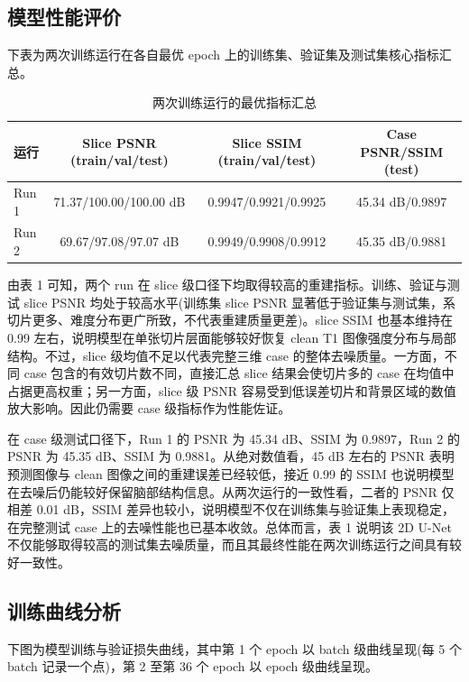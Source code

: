 \documentclass[UTF8,a4paper,12pt]{ctexart}
\begin{document}
\subsection{模型性能评价}

下表为两次训练运行在各自最优 epoch 上的训练集、验证集及测试集核心指标汇总。

\begin{table}[H]
\centering
\caption{两次训练运行的最优指标汇总}
\begin{tabular}{lccc}
\toprule
运行 & Slice PSNR (train/val/test) & Slice SSIM (train/val/test) & Case PSNR/SSIM (test) \\
\midrule
Run 1 & 71.37/100.00/100.00 dB & 0.9947/0.9921/0.9925 & 45.34 dB/0.9897 \\
Run 2 & 69.67/97.08/97.07 dB & 0.9949/0.9908/0.9912 & 45.35 dB/0.9881 \\
\bottomrule
\end{tabular}
\end{table}

由表 1 可知，两个 run 在 slice 级口径下均取得较高的重建指标。训练、验证与测试 slice PSNR 均处于较高水平(训练集 slice PSNR 显著低于验证集与测试集，系切片更多、难度分布更广所致，不代表重建质量更差)。slice SSIM 也基本维持在 0.99 左右，说明模型在单张切片层面能够较好恢复 clean T1 图像强度分布与局部结构。不过，slice 级均值不足以代表完整三维 case 的整体去噪质量。一方面，不同 case 包含的有效切片数不同，直接汇总 slice 结果会使切片多的 case 在均值中占据更高权重；另一方面，slice 级 PSNR 容易受到低误差切片和背景区域的数值放大影响。因此仍需要 case 级指标作为性能佐证。

在 case 级测试口径下，Run 1 的 PSNR 为 45.34 dB、SSIM 为 0.9897，Run 2 的 PSNR 为 45.35 dB、SSIM 为 0.9881。从绝对数值看，45 dB 左右的 PSNR 表明预测图像与 clean 图像之间的重建误差已经较低，接近 0.99 的 SSIM 也说明模型在去噪后仍能较好保留脑部结构信息。从两次运行的一致性看，二者的 PSNR 仅相差 0.01 dB，SSIM 差异也较小，说明模型不仅在训练集与验证集上表现稳定，在完整测试 case 上的去噪性能也已基本收敛。总体而言，表 1 说明该 2D U-Net 不仅能够取得较高的测试集去噪质量，而且其最终性能在两次训练运行之间具有较好一致性。

\subsection{训练曲线分析}

下图为模型训练与验证损失曲线，其中第 1 个 epoch 以 batch 级曲线呈现(每 5 个 batch 记录一个点)，第 2 至第 36 个 epoch 以 epoch 级曲线呈现。
\end{document}
